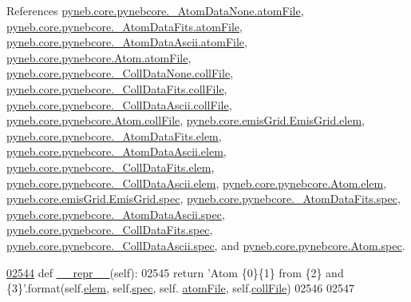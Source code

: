 References \hyperlink{pynebcore_8py_source_l00053}{pyneb.\+core.\+pynebcore.\+\_\+\+Atom\+Data\+None.\+atom\+File}, \hyperlink{pynebcore_8py_source_l00105}{pyneb.\+core.\+pynebcore.\+\_\+\+Atom\+Data\+Fits.\+atom\+File}, \hyperlink{pynebcore_8py_source_l00318}{pyneb.\+core.\+pynebcore.\+\_\+\+Atom\+Data\+Ascii.\+atom\+File}, \hyperlink{pynebcore_8py_source_l01194}{pyneb.\+core.\+pynebcore.\+Atom.\+atom\+File}, \hyperlink{pynebcore_8py_source_l00069}{pyneb.\+core.\+pynebcore.\+\_\+\+Coll\+Data\+None.\+coll\+File}, \hyperlink{pynebcore_8py_source_l00598}{pyneb.\+core.\+pynebcore.\+\_\+\+Coll\+Data\+Fits.\+coll\+File}, \hyperlink{pynebcore_8py_source_l00949}{pyneb.\+core.\+pynebcore.\+\_\+\+Coll\+Data\+Ascii.\+coll\+File}, \hyperlink{pynebcore_8py_source_l01249}{pyneb.\+core.\+pynebcore.\+Atom.\+coll\+File}, \hyperlink{emis_grid_8py_source_l00045}{pyneb.\+core.\+emis\+Grid.\+Emis\+Grid.\+elem}, \hyperlink{pynebcore_8py_source_l00083}{pyneb.\+core.\+pynebcore.\+\_\+\+Atom\+Data\+Fits.\+elem}, \hyperlink{pynebcore_8py_source_l00304}{pyneb.\+core.\+pynebcore.\+\_\+\+Atom\+Data\+Ascii.\+elem}, \hyperlink{pynebcore_8py_source_l00560}{pyneb.\+core.\+pynebcore.\+\_\+\+Coll\+Data\+Fits.\+elem}, \hyperlink{pynebcore_8py_source_l00910}{pyneb.\+core.\+pynebcore.\+\_\+\+Coll\+Data\+Ascii.\+elem}, \hyperlink{pynebcore_8py_source_l01165}{pyneb.\+core.\+pynebcore.\+Atom.\+elem}, \hyperlink{emis_grid_8py_source_l00046}{pyneb.\+core.\+emis\+Grid.\+Emis\+Grid.\+spec}, \hyperlink{pynebcore_8py_source_l00084}{pyneb.\+core.\+pynebcore.\+\_\+\+Atom\+Data\+Fits.\+spec}, \hyperlink{pynebcore_8py_source_l00305}{pyneb.\+core.\+pynebcore.\+\_\+\+Atom\+Data\+Ascii.\+spec}, \hyperlink{pynebcore_8py_source_l00561}{pyneb.\+core.\+pynebcore.\+\_\+\+Coll\+Data\+Fits.\+spec}, \hyperlink{pynebcore_8py_source_l00911}{pyneb.\+core.\+pynebcore.\+\_\+\+Coll\+Data\+Ascii.\+spec}, and \hyperlink{pynebcore_8py_source_l01166}{pyneb.\+core.\+pynebcore.\+Atom.\+spec}.


\begin{DoxyCode}
\hypertarget{classpyneb_1_1core_1_1pynebcore_1_1_atom_l02544}{}\hyperlink{classpyneb_1_1core_1_1pynebcore_1_1_atom_a30b539ebf4b4d3bc804bfdf0f8174d9f}{02544}     \textcolor{keyword}{def }\hyperlink{classpyneb_1_1core_1_1pynebcore_1_1_atom_a30b539ebf4b4d3bc804bfdf0f8174d9f}{\_\_repr\_\_}(self):
02545         \textcolor{keywordflow}{return} \textcolor{stringliteral}{'Atom \{0\}\{1\} from \{2\} and \{3\}'}.format(self.\hyperlink{classpyneb_1_1core_1_1pynebcore_1_1_atom_ae722bd0e35e1c8cdc0018d56c34171cf}{elem}, self.\hyperlink{classpyneb_1_1core_1_1pynebcore_1_1_atom_a02c0f7146a2f5b8eac765a453c763797}{spec}, self.
      \hyperlink{classpyneb_1_1core_1_1pynebcore_1_1_atom_a0d74c41b1e0ac1a9cd5591467769d07f}{atomFile}, self.\hyperlink{classpyneb_1_1core_1_1pynebcore_1_1_atom_a356995bd5cadff6ea70cacb74f5c49e1}{collFile})
02546 
02547 
\end{DoxyCode}
\hypertarget{classpyneb_1_1core_1_1pynebcore_1_1_atom_ad1d75f64b27a6acee079b5738b69dabe}{}
